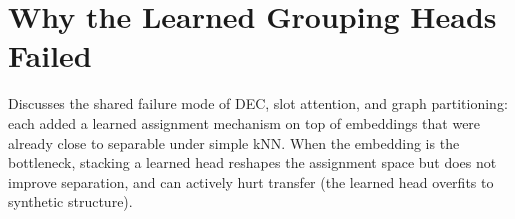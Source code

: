 \section{Why the Learned Grouping Heads Failed}
\label{sec_disc_heads}

Discusses the shared failure mode of DEC, slot attention, and graph partitioning: each added a learned assignment mechanism on top of embeddings that were already close to separable under simple kNN. When the embedding is the bottleneck, stacking a learned head reshapes the assignment space but does not improve separation, and can actively hurt transfer (the learned head overfits to synthetic structure).
